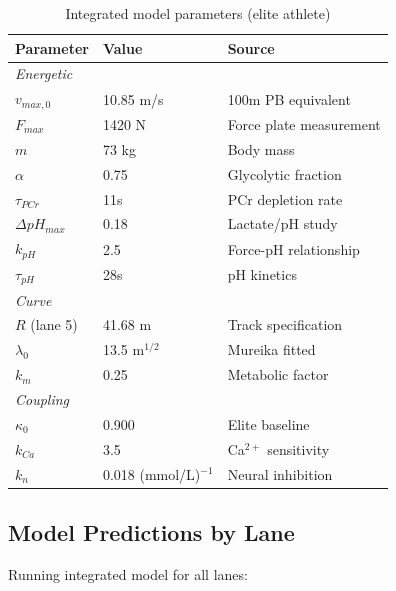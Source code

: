 \begin{table}[H]
\centering
\caption{Integrated model parameters (elite athlete)}
\begin{tabular}{@{}lll@{}}
\toprule
\textbf{Parameter} & \textbf{Value} & \textbf{Source} \\
\midrule
\multicolumn{3}{l}{\textit{Energetic}} \\
$v_{max,0}$ & 10.85 m/s & 100m PB equivalent \\
$F_{max}$ & 1420 N & Force plate measurement \\
$m$ & 73 kg & Body mass \\
$\alpha$ & 0.75 & Glycolytic fraction \\
$\tau_{PCr}$ & 11s & PCr depletion rate \\
$\Delta pH_{max}$ & 0.18 & Lactate/pH study \\
$k_{pH}$ & 2.5 & Force-pH relationship \\
$\tau_{pH}$ & 28s & pH kinetics \\
\midrule
\multicolumn{3}{l}{\textit{Curve}} \\
$R$ (lane 5) & 41.68 m & Track specification \\
$\lambda_0$ & 13.5 m$^{1/2}$ & Mureika fitted \\
$k_m$ & 0.25 & Metabolic factor \\
\midrule
\multicolumn{3}{l}{\textit{Coupling}} \\
$\kappa_0$ & 0.900 & Elite baseline \\
$k_{Ca}$ & 3.5 & Ca$^{2+}$ sensitivity \\
$k_n$ & 0.018 (mmol/L)$^{-1}$ & Neural inhibition \\
\bottomrule
\end{tabular}
\end{table}

\subsection{Model Predictions by Lane}

Running integrated model for all lanes:

